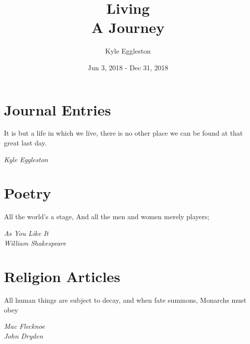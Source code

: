 \documentclass{book}
\title{%
  Living \\
  \large A Journey}
\author{Kyle Eggleston}
\date{Jun 3, 2018 - Dec 31, 2018}
\begin{document}
\maketitle
\thispagestyle{empty}

\frontmatter

\tableofcontents

\listoffigures

\newpage



\mainmatter

\chapter{Journal Entries}
\epigraph{It is but a life in which we live, there is no other place we can be
found at that great last day.}{\textit{Kyle Eggleston}}






















\chapter{Poetry}
\epigraph{All the world’s a stage, And all the men and women merely players;}
{\textit{As You Like It \\ William Shakespeare}}





\chapter{Religion Articles}
\epigraph{All human things are subject to decay, and when fate 
summons, Monarchs must obey}{\textit{Mac Flecknoe \\ John Dryden}}











\newpage

\appendix




\backmatter
\printbibliography
\end{document}
